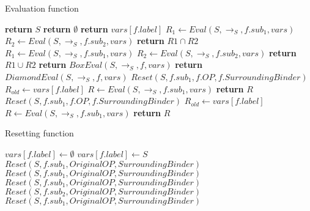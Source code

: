 \documentclass[10pt,a4paper]{article}
\begin{document}
\begin{algorithm}[H]
\caption{Evaluation function}\label{alg:evalel-proc}
\begin{algorithmic}[1]
        	\State \textbf{return} $S$ 
			\State \textbf{return} $\emptyset$ 
			\State \textbf{return} $vars[f.label]$ 
        	\State $R_1 \gets Eval(S,\to_S,f.sub_1,vars)$ 
        	\State $R_2 \gets Eval(S,\to_S,f.sub_2,vars)$ 
			\State \textbf{return} $R1 \cap R2$ 
        	\State $R_1 \gets Eval(S,\to_S,f.sub_1,vars)$ 
        	\State $R_2 \gets Eval(S,\to_S,f.sub_2,vars)$ 
			\State \textbf{return} $R1 \cup R2$ 
			\State \textbf{return} $BoxEval(S,\to_S,f,vars)$ 
			\State \textbf{return} $DiamondEval(S,\to_S,f,vars)$ 
        		\State $Reset(S, f.sub_1, f.OP, f.SurroundingBinder)$
        	\EndIf
			\Repeat
				\State $R_{old} \gets vars[f.label]$
				\State $R \gets Eval(S,\to_S,f.sub_1,vars)$
			\State \textbf{return} $R$ 	
        		\State $Reset(S, f.sub_1, f.OP, f.SurroundingBinder)$
        	\EndIf 
			\Repeat
				\State $R_{old} \gets vars[f.label]$
				\State $R \gets Eval(S,\to_S,f.sub_1,vars)$
			\State \textbf{return} $R$ 		
        \EndIf
	\EndProcedure
\end{algorithmic}
\end{algorithm}

\begin{algorithm}[H]
\caption{Resetting function}\label{alg:reset-proc}
\begin{algorithmic}[1]
					\State $vars[f.label] \gets \emptyset$
				\Else
					\State $vars[f.label] \gets S$
				\EndIf
				\State $Reset(S, f.sub_1, OriginalOP, SurroundingBinder)$
			\Else
				\State $Reset(S, f.sub_1, OriginalOP, SurroundingBinder)$
			\EndIf
		\Else
				\State $Reset(S, f.sub_1, OriginalOP, SurroundingBinder)$
				\State $Reset(S, f.sub_2, OriginalOP, SurroundingBinder)$
				\State $Reset(S, f.sub_1, OriginalOP, SurroundingBinder)$
			\EndIf
		\EndIf
	\EndProcedure
\end{algorithmic}
\end{algorithm}
\end{document}
